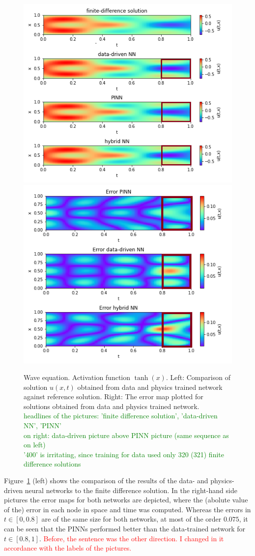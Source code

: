 \begin{figure}[t!]
\begin{center}
\includegraphics[width=0.4\linewidth]{../Code/B1/plots/colormap.png}
\includegraphics[width=0.4\linewidth]{../Code/B1/plots/error_colormap.png}
\end{center}
\caption{Wave equation. Activation function $\tanh(x)$. Left: Comparison of solution $u(x,t)$ obtained from data and physics trained network against reference solution. Right: The error map plotted for solutions obtained from data and physics trained network.\\
\textcolor{green}{headlines of the pictures: 'finite difference solution', 'data-driven NN', 'PINN'}\\
\textcolor{green}{on right: data-driven picture above PINN picture (same sequence as on left)}\\
\textcolor{green}{'400' is irritating, since training for data used only 320 (321) finite difference solutions}
}\label{fig:wave_sol_error}
\end{figure}

Figure~\ref{fig:wave_sol_error} (left) shows the comparison of the results of the 
data- and physics-driven neural networks to the finite difference solution. 
In the right-hand side pictures the error maps for both networks are depicted, where the 
(abolute value of the) error in each node in space and time was computed. 
Whereas the errors in $t\in[0,0.8]$ are of the same size for both networks, at most of the order $0.075$,
it can be seen that the PINNs performed better than the data-trained network for $t\in[0.8,1]$.
\textcolor{red}{Before, the sentence was the other direction. I changed in it accordance with the labels 
of the pictures.}

